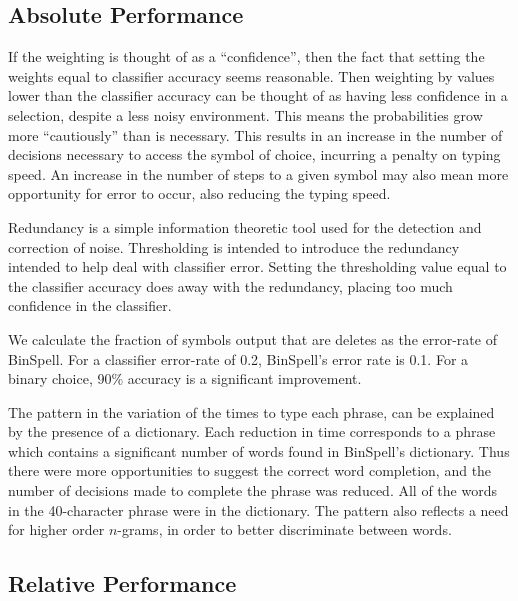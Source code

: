 \documentclass[12pt,titlepage]{article}
\begin{document}
\subsection{Absolute Performance}

If the weighting is thought of as a ``confidence'', then the fact that setting the weights equal to 
classifier accuracy seems reasonable.  Then weighting by values lower than the classifier 
accuracy can be thought of as having less confidence in a selection, despite a less noisy 
environment.  This means the probabilities grow more ``cautiously'' than is necessary.  This 
results in an increase in the number of decisions necessary to access the symbol of choice, 
incurring a penalty on typing speed.  An increase in the number of steps to a given symbol may 
also mean more opportunity for error to occur, also reducing the typing speed.

Redundancy is a simple information theoretic tool used for the detection and correction of noise.  Thresholding is intended to introduce the redundancy intended to help deal with classifier error.  Setting the thresholding value equal to the classifier accuracy does away with the redundancy, placing too much confidence in the classifier.

We calculate the fraction of symbols output that are deletes as the error-rate of BinSpell.  For a classifier error-rate of 0.2, BinSpell's error rate is 0.1.  For a binary choice, 90\% accuracy is a significant improvement.  

The pattern in the variation of the times to type each phrase, can be explained by 
the presence of a dictionary.  Each reduction in time corresponds to a phrase 
which contains a significant number of words found in BinSpell's dictionary.  Thus there were 
more opportunities to suggest the correct word completion, and the number of decisions made 
to complete the phrase was reduced.  All of the words in the 40-character phrase were in the 
dictionary.  The pattern also reflects a need for higher order $n$-grams, in order to better 
discriminate between words.

\subsection{Relative Performance}
\end{document}
